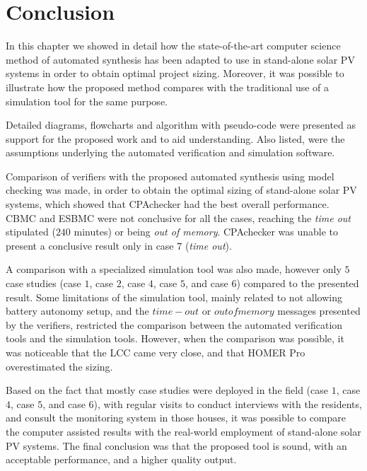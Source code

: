 \section{Conclusion}

In this chapter we showed in detail how the state-of-the-art computer science method of automated synthesis has been adapted to use in stand-alone solar PV systems in order to obtain optimal project sizing. Moreover, it was possible to illustrate how the proposed method compares with the traditional use of a simulation tool for the same purpose.

Detailed diagrams, flowcharts and algorithm with pseudo-code were presented as support for the proposed work and to aid understanding. Also listed, were the assumptions underlying the automated verification and simulation software. 

Comparison of verifiers with the proposed automated synthesis using model checking was made, in order to obtain the optimal sizing of stand-alone solar PV systems, which showed that CPAchecker had the best overall performance. CBMC and ESBMC were not conclusive for all the cases, reaching the \textit{time out} stipulated ($240$ minutes) or being \textit{out of memory}. CPAchecker was unable to present a conclusive result only in case $7$ (\textit{time out}).

A comparison with a specialized simulation tool was also made, however only $5$ case studies (case $1$, case $2$, case $4$, case $5$, and case $6$) compared to the presented result. Some limitations of the simulation tool, mainly related to not allowing battery autonomy setup, and the $time-out$ or $out of memory$ messages presented by the verifiers, restricted the comparison between the automated verification tools and the simulation tools. However, when the comparison was possible, it was noticeable that the LCC came very close, and that HOMER Pro overestimated the sizing.

Based on the fact that mostly case studies were deployed in the field (case $1$, case $4$, case $5$, and case $6$), with regular visits to conduct interviews with the residents, and consult the monitoring system in those houses, it was possible to compare the computer assisted results with the real-world employment of stand-alone solar PV systems. The final conclusion was that the proposed tool is sound, with an acceptable performance, and a higher quality output.